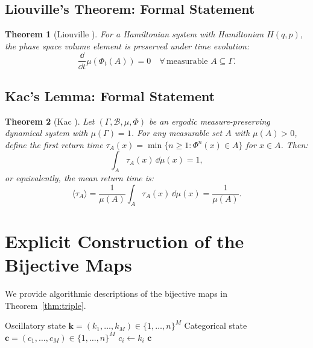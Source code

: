 \documentclass[11pt,twocolumn,a4paper]{article}
\newtheorem{theorem}{Theorem}[section]
\begin{document}
\subsection{Liouville's Theorem: Formal Statement}

\begin{theorem}[Liouville \citep{liouville1838,goldstein2002}]
For a Hamiltonian system with Hamiltonian $H(q,p)$, the phase
space volume element is preserved under time evolution:
\begin{equation}
\frac{\dd}{\dd{t}} \mu(\Phi_t(A)) = 0
\quad \forall\,\text{measurable } A \subseteq \Gamma.
\end{equation}
\end{theorem}

\subsection{Kac's Lemma: Formal Statement}

\begin{theorem}[Kac \citep{kac1947}]
Let $(\Gamma, \mathcal{B}, \mu, \Phi)$ be an ergodic
measure-preserving dynamical system with $\mu(\Gamma) = 1$. For any
measurable set $A$ with $\mu(A) > 0$, define the first return time
$\tau_A(x) = \min\{n \geq 1 : \Phi^n(x) \in A\}$ for $x \in A$.
Then:
\begin{equation}
\int_A \tau_A(x)\,\dd{\mu(x)} = 1,
\end{equation}
or equivalently, the mean return time is:
\begin{equation}
\langle \tau_A \rangle
= \frac{1}{\mu(A)} \int_A \tau_A(x)\,\dd{\mu(x)}
= \frac{1}{\mu(A)}.
\end{equation}
\end{theorem}


\section{Explicit Construction of the Bijective Maps}
\label{app:bijections}

We provide algorithmic descriptions of the bijective maps in
Theorem~\ref{thm:triple}.

\begin{algorithm}[H]
\caption{$\varphi_{12}$: Oscillatory $\to$ Categorical}
\label{alg:phi12}
\begin{algorithmic}[1]
\Require Oscillatory state $\bm{k} = (k_1, \ldots, k_M) \in
  \{1,\ldots,n\}^M$
\Ensure Categorical state $\bm{c} = (c_1, \ldots, c_M) \in
  \{1,\ldots,n\}^M$
  \State $c_i \gets k_i$
\EndFor
\State \Return $\bm{c}$
\end{algorithmic}
\end{algorithm}
\end{document}
